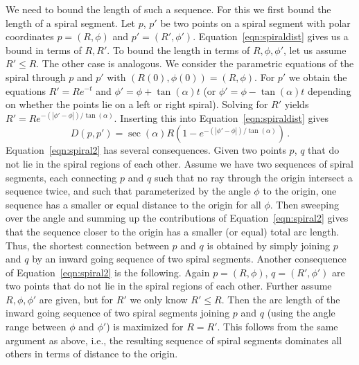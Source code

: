 \documentclass{journalA4}
\begin{document}
We need to bound the length of such a sequence. For this we first bound the length of a spiral segment. Let $p$, $p'$ be two points on a spiral segment with polar coordinates $p = (R,\phi)$ and $p' = (R',\phi')$. Equation~\ref{eqn:spiraldist} gives us a bound in terms of $R, R'$. To bound the length in terms of $R,\phi,\phi'$, let us assume $R' \leq R$. The other case is analogous. We consider the parametric equations of the spiral through $p$ and $p'$ with $(R(0),\phi(0)) = (R, \phi)$. For $p'$ we obtain the equations $R' = R e^{-t}$ and $\phi' = \phi + \tan (\alpha) t$ (or $\phi' = \phi - \tan (\alpha) t$ depending on whether the points lie on a left or right spiral). Solving for $R'$ yields
$R' = R e^{- (|\phi'-\phi|)/\tan (\alpha)}$.
Inserting this into Equation~\ref{eqn:spiraldist} gives
\begin{equation}
\label{eqn:spiral2}
D(p,p') = \sec (\alpha) R (1-e^{- (|\phi'-\phi|)/\tan (\alpha)})\, .
\end{equation}
Equation~\ref{eqn:spiral2} has several consequences. Given two points $p$, $q$ that do not lie in the spiral regions of each other. Assume we have two sequences of spiral segments, each connecting $p$ and $q$ such that no ray through the origin intersect a sequence twice, and such that parameterized by the angle $\phi$ to the origin, one sequence has a smaller or equal distance to the origin for all $\phi$. Then sweeping over the angle and summing up the contributions of Equation~\ref{eqn:spiral2} gives that the sequence closer to the origin has a smaller (or equal) total arc length. Thus, the shortest connection between $p$ and $q$ is obtained by simply joining $p$ and $q$ by an inward going sequence of two spiral segments. 
Another consequence of Equation~\ref{eqn:spiral2} is the following. Again $p = (R, \phi)$, $q = (R', \phi')$ are two points that do not lie in the spiral regions of each other. Further assume $R, \phi, \phi'$ are given, but for $R'$ we only know $R' \leq R$. Then the arc length of the inward going sequence of two spiral segments joining $p$ and $q$ (using the angle range between $\phi$ and $\phi'$) is maximized for $R=R'$. This follows from the same argument as above, i.e., the resulting
sequence of spiral segments dominates all others in terms of distance to the origin.
\end{document}

